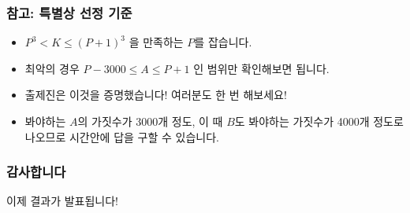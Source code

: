 \documentclass[xetex]{beamer}
\begin{document}
\begin{frame}
  \frametitle{참고: 특별상 선정 기준}
  \begin{itemize}
    \item $P^3 < K \le (P+1)^3$  을 만족하는 $P$를 잡습니다.
    \item 최악의 경우 $P - 3000 \le A \le P+1$ 인 범위만 확인해보면 됩니다.
    \item 출제진은 이것을 증명했습니다! 여러분도 한 번 해보세요!
    \item 봐야하는 $A$의 가짓수가 3000개 정도, 이 때 $B$도 봐야하는 가짓수가 4000개 정도로 나오므로 시간안에 답을 구할 수 있습니다.
  \end{itemize}
\end{frame}

\begin{frame}
  \frametitle{감사합니다}
  \begin{center}
    이제 결과가 발표됩니다!
  \end{center}
\end{frame}
\end{document}
